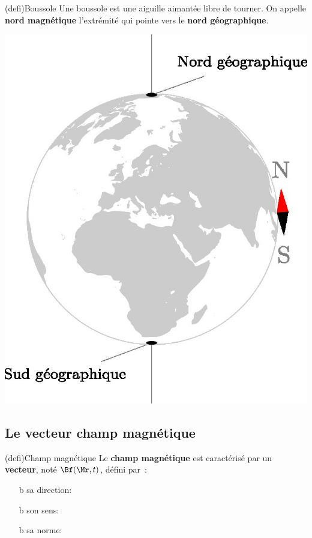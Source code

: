 \documentclass[../../main/main.tex]{subfiles}
\begin{document}
\begin{tcb*}[sidebyside, righthand ratio=.2](defi){Boussole}
        Une boussole est une aiguille aimantée libre de tourner. On appelle
      \textbf{nord magnétique} l'extrémité qui pointe vers le \textbf{nord
      géographique}.
    \tcblower
    \begin{center}
      \includegraphics[width=\linewidth]{bouss_terre.jpg}
    \end{center}
\end{tcb*}

\subsection{Le vecteur champ magnétique}
\begin{tcb*}(defi){Champ magnétique}
	Le \textbf{champ magnétique} est caractérisé par un
		\textbf{vecteur}, noté $\Bf (\Mr,t)$, défini par~:
		\begin{itemize}
      \item[b]{sa direction}: 
      \item[b]{son sens}: 
      \item[b]{sa norme}: 
		\end{itemize}
\end{tcb*}
\end{document}
